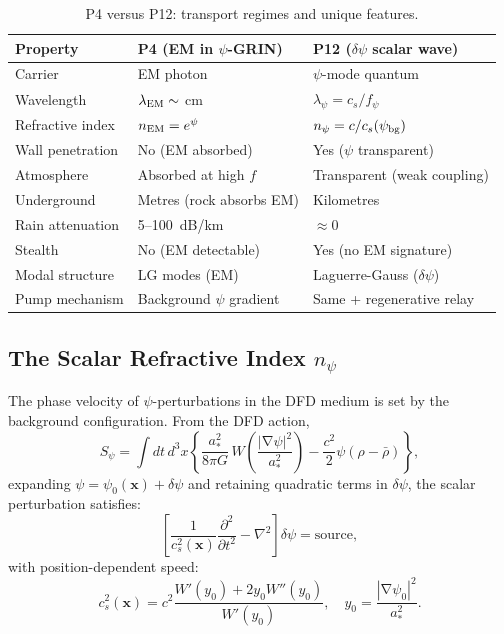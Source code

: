 \documentclass[aps,prd,twocolumn,superscriptaddress]{revtex4-2}
\newcommand{\npsi}{n_\psi}
\DeclareMathOperator{\grad}{\nabla}
\begin{document}
\begin{table}[h]
\caption{P4 versus P12: transport regimes and unique features.}
\label{tab:p4vsp12}
\begin{ruledtabular}
\begin{tabular}{lll}
Property & P4 (EM in $\psi$-GRIN) & P12 ($\delta\psi$ scalar wave) \\
\hline
Carrier & EM photon & $\psi$-mode quantum \\
Wavelength & $\lambda_{\rm EM} \sim $ cm & $\lambda_\psi = c_s/f_\psi$ \\
Refractive index & $n_{\rm EM} = e^\psi$ & $\npsi = c/c_s(\psi_{\rm bg})$ \\
Wall penetration & No (EM absorbed) & Yes ($\psi$ transparent) \\
Atmosphere & Absorbed at high $f$ & Transparent (weak coupling) \\
Underground & Metres (rock absorbs EM) & Kilometres \\
Rain attenuation & 5--100~dB/km & $\approx 0$ \\
Stealth & No (EM detectable) & Yes (no EM signature) \\
Modal structure & LG modes (EM) & Laguerre-Gauss ($\delta\psi$) \\
Pump mechanism & Background $\psi$ gradient & Same + regenerative relay \\
\end{tabular}
\end{ruledtabular}
\end{table}

\subsection{The Scalar Refractive Index $\npsi$}

The phase velocity of $\psi$-perturbations in the DFD medium is set
by the background configuration.  From the DFD action,
\begin{equation}
S_\psi = \int dt\,d^3x\left\{
  \frac{a_*^2}{8\pi G}\,W\!\left(\frac{|\grad\psi|^2}{a_*^2}\right)
  - \frac{c^2}{2}\psi(\rho - \bar\rho)
\right\},
\label{eq:dfd-action}
\end{equation}
expanding $\psi = \psi_0(\mathbf{x}) + \delta\psi$ and retaining
quadratic terms in $\delta\psi$, the scalar perturbation satisfies:
\begin{equation}
\left[\frac{1}{c_s^2(\mathbf{x})}\frac{\partial^2}{\partial t^2}
- \nabla^2\right]\delta\psi = \text{source},
\label{eq:scalar-wave}
\end{equation}
with position-dependent speed:
\begin{equation}
c_s^2(\mathbf{x}) = c^2\frac{W'(y_0) + 2y_0 W''(y_0)}{W'(y_0)},
\quad y_0 = \frac{|\grad\psi_0|^2}{a_*^2}.
\label{eq:sound-speed}
\end{equation}
\end{document}

